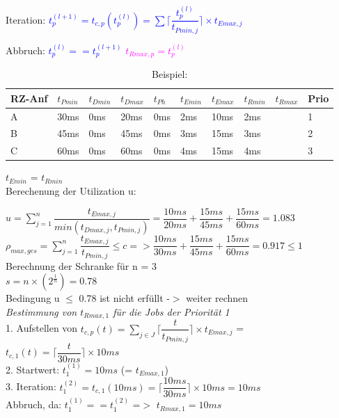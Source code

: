 \documentclass[12pt,a4paper,oneside,ngerman]{article}
\begin{document}
Iteration: \textcolor{blue}{ \( t_{p}^{(l+1)} = t_{c,p}(t_{p}^{(l)}) = \displaystyle\sum \Big\lceil \dfrac{t_{p}^{(l)}}{ t_{Pmin,j} } \Big\rceil \times t_{Emax,j} \) }

Abbruch: \textcolor{blue}{ \( t_{p}^{(l)} == t_{p}^{(l+1)} \) }  \textcolor{magenta}{ \( t_{Rmax,p} = t_{p}^{(l)} \) }

\pagebreak

\begin{table}[H]
	\caption{Beispiel:}
	\begin{tabular}{|l|l|l|l|l|l|l|l|l|l|}
	\hline
	RZ-Anf & \(t_{Pmin}\) & \(t_{Dmin}\) & \(t_{Dmax}\) & \(t_{Ph}\) & \(t_{Emin}\) & \(t_{Emax}\) & \(t_{Rmin}\) & \(t_{Rmax}\) & Prio \\ \hline
	A      & 30ms         & 0ms          & 20ms         & 0ms        & 2ms          & 10ms         & 2ms          &              & 1    \\ \hline
	B      & 45ms         & 0ms          & 45ms         & 0ms        & 3ms          & 15ms         & 3ms          &              & 2    \\ \hline
	C      & 60ms         & 0ms          & 60ms         & 0ms        & 4ms          & 15ms         & 4ms          &              & 3    \\ \hline
	\end{tabular}
\end{table}

\(t_{Emin}\) = \(t_{Rmin}\)\\

Berechenung der Utilization u:

\(u = \displaystyle\sum_{j=1}^n \dfrac{t_{Emax,j}}{ min(t_{Dmax,j}, t_{Pmin,j})}  =  \dfrac{10ms}{20ms} + \dfrac{15ms}{45ms} + \dfrac{15ms}{60ms} = 1.083 \)\\
\(\rho_{max,ges} = \displaystyle\sum_{j=1}^n \dfrac{t_{Emax,j}}{t_{Pmin,j}} \leq c => \dfrac{10ms}{30ms} + \dfrac{15ms}{45ms} + \dfrac{15ms}{60ms} = 0.917 \leq 1\)\\

Berechnung der Schranke für n = 3 \\
\(s = n\times( 2^\frac{1}{n}) = 0.78\)\\

Bedingung u $\leq$ 0.78 ist nicht erfüllt -$>$ weiter rechnen\\

\emph{Bestimmung von \(t_{Rmax,1}\) für die Jobs der Priorität 1}\\
1. Aufstellen von \( t_{c,p}(t) = \displaystyle\sum_{j \in J} \Big\lceil \dfrac{t}{ t_{Pmin,j} } \Big\rceil \times t_{Emax,j} \) = \( t_{c,1}(t) = \Big\lceil \dfrac{t}{ 30ms } \Big\rceil \times 10ms \)\\
2. Startwert: \( t_{1}^{(1)} = 10ms \) (= \(t_{Emax,1}\)) \\
3. Iteration: \( t_{1}^{(2)} = t_{c,1}(10ms) = \Big\lceil \dfrac{10ms}{30ms} \Big\rceil \times 10ms = 10ms\)\\
Abbruch, da: \( t_{1}^{(1)} == t_{1}^{(2)} \) =$>$ \( t_{Rmax,1} = 10ms \)\\
\end{document}
